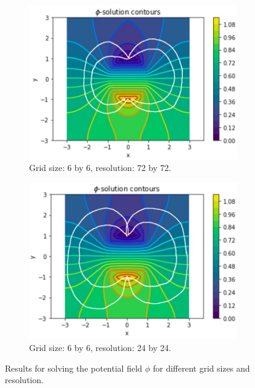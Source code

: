 \begin{figure}
\begin{subfigure}[b]{0.49\linewidth}
		\includegraphics[width=\linewidth]{Materials/667272}
		\caption{Grid size: 6 by 6, resolution: 72 by 72.}
	\end{subfigure}
	\hfill
	\begin{subfigure}[b]{0.49\linewidth}
		\centering
		\includegraphics[width=\linewidth]{Materials/662424}
		\caption{Grid size: 6 by 6, resolution: 24 by 24.}
	\end{subfigure}
	\caption{Results for solving the potential field $\phi$ for different grid sizes and resolution.}
	\label{results}
\end{figure}

